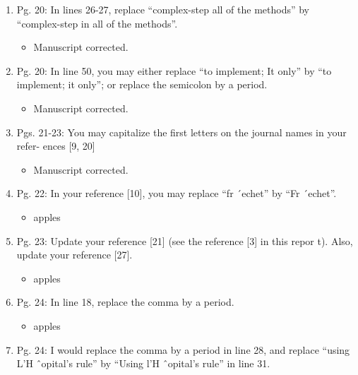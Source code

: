 \documentclass{article}
\begin{document}
\begin{enumerate}
\begin{enumerate}
 \item Pg. 20: In lines 26-27, replace “complex-step all of the methods” by “complex-step
in all of the methods”.

{\color{red}  
\begin{itemize}
     \item
 Manuscript corrected.
  \end{itemize}}

 \item Pg. 20: In line 50, you may either replace “to implement; It only” by “to implement;
it only”; or replace the semicolon by a period.

{\color{red}  
\begin{itemize}
     \item
 Manuscript corrected.
  \end{itemize}}

 \item Pgs. 21-23: You may capitalize the ﬁrst letters on the journal names in your refer-
ences [9, 20]

{\color{red}  
\begin{itemize}
     \item
 Manuscript corrected.
  \end{itemize}}

 \item Pg. 22: In your reference [10], you may replace “fr ´echet” by “Fr ´echet”.

{\color{red}  
\begin{itemize}
     \item
      apples
  \end{itemize}}

 \item Pg. 23: Update your reference [21] (see the reference [3] in this repor t). Also,
update your reference [27].

{\color{red}  
\begin{itemize}
     \item
      apples
  \end{itemize}}

 \item Pg. 24: In line 18, replace the comma by a period.

{\color{red}  
\begin{itemize}
     \item
      apples
  \end{itemize}}

 \item Pg. 24: I would replace the comma by a period in line 28, and replace “using
L’H ˆopital’s rule” by “Using l’H ˆopital’s rule” in line 31.


\end{enumerate}
\end{enumerate}
\end{document}
